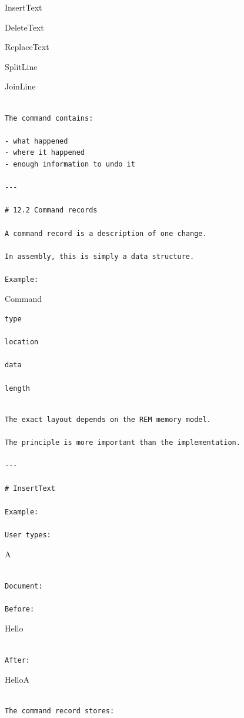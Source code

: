 \documentclass[
  oneside,
  openany]{book}
\begin{document}
InsertText

DeleteText

ReplaceText

SplitLine

JoinLine

\begin{verbatim}

The command contains:

- what happened
- where it happened
- enough information to undo it

---

# 12.2 Command records

A command record is a description of one change.

In assembly, this is simply a data structure.

Example:
\end{verbatim}

Command

\begin{verbatim}
type

location

data

length
\end{verbatim}

\begin{verbatim}

The exact layout depends on the REM memory model.

The principle is more important than the implementation.

---

# InsertText

Example:

User types:
\end{verbatim}

A

\begin{verbatim}

Document:

Before:
\end{verbatim}

Hello

\begin{verbatim}

After:
\end{verbatim}

HelloA

\begin{verbatim}

The command record stores:
\end{verbatim}
\end{document}
